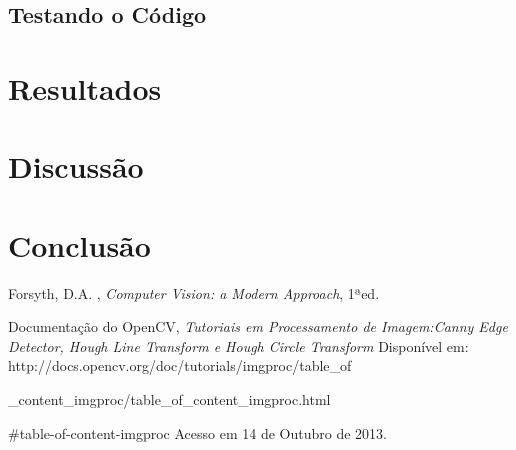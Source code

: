 \documentclass[journal]{IEEEtran}
\begin{document}
\subsection{Testando o Código}

\section{Resultados}
\newpage
\section{Discussão}
\section{Conclusão}
\begin{thebibliography}{1}

Forsyth, D.A. , \emph{Computer Vision: a Modern Approach}, 1ªed.

 Documentação do OpenCV, \emph{Tutoriais em Processamento de 
Imagem:Canny Edge Detector, Hough Line Transform e
 Hough Circle Transform}
 Disponível em: http://docs.opencv.org/doc/tutorials/imgproc/table\_of
 
 \_content\_imgproc/table\_of\_content\_imgproc.html
 
 \#table-of-content-imgproc
	 Acesso em 14 de Outubro de 2013.
\end{thebibliography}
\end{document}
